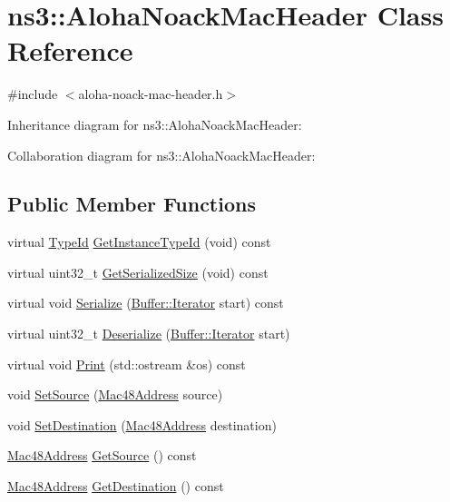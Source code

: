 \hypertarget{classns3_1_1AlohaNoackMacHeader}{}\section{ns3\+:\+:Aloha\+Noack\+Mac\+Header Class Reference}
\label{classns3_1_1AlohaNoackMacHeader}


{\ttfamily \#include $<$aloha-\/noack-\/mac-\/header.\+h$>$}



Inheritance diagram for ns3\+:\+:Aloha\+Noack\+Mac\+Header\+:


Collaboration diagram for ns3\+:\+:Aloha\+Noack\+Mac\+Header\+:
\subsection*{Public Member Functions}
\begin{DoxyCompactItemize}
\item 
virtual \hyperlink{classns3_1_1TypeId}{Type\+Id} \hyperlink{classns3_1_1AlohaNoackMacHeader_ad170da486db4a27571993fcef5bd1866}{Get\+Instance\+Type\+Id} (void) const 
\item 
virtual uint32\+\_\+t \hyperlink{classns3_1_1AlohaNoackMacHeader_acce19905b05942353076303f6bd70ba8}{Get\+Serialized\+Size} (void) const 
\item 
virtual void \hyperlink{classns3_1_1AlohaNoackMacHeader_a4b7cd770822b9156789468e3561b9a54}{Serialize} (\hyperlink{classns3_1_1Buffer_1_1Iterator}{Buffer\+::\+Iterator} start) const 
\item 
virtual uint32\+\_\+t \hyperlink{classns3_1_1AlohaNoackMacHeader_a5a244ff094c5a2d56869e3a9f0553463}{Deserialize} (\hyperlink{classns3_1_1Buffer_1_1Iterator}{Buffer\+::\+Iterator} start)
\item 
virtual void \hyperlink{classns3_1_1AlohaNoackMacHeader_a3b56d2979519ef93f13c47e2993771c5}{Print} (std\+::ostream \&os) const 
\item 
void \hyperlink{classns3_1_1AlohaNoackMacHeader_aecdaa8320b59ae5ffc2540e119d40442}{Set\+Source} (\hyperlink{classns3_1_1Mac48Address}{Mac48\+Address} source)
\item 
void \hyperlink{classns3_1_1AlohaNoackMacHeader_a828d3ae43daa673888d13b7ada1b777f}{Set\+Destination} (\hyperlink{classns3_1_1Mac48Address}{Mac48\+Address} destination)
\item 
\hyperlink{classns3_1_1Mac48Address}{Mac48\+Address} \hyperlink{classns3_1_1AlohaNoackMacHeader_a7a20b4ef6f45fe8590100d51ccc36e0c}{Get\+Source} () const 
\item 
\hyperlink{classns3_1_1Mac48Address}{Mac48\+Address} \hyperlink{classns3_1_1AlohaNoackMacHeader_ac88d4bb27c5835ff81f7b38b67853f8d}{Get\+Destination} () const 
\end{DoxyCompactItemize}
